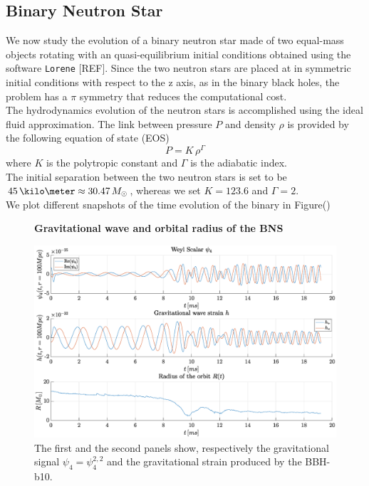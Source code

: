 \subsection{Binary Neutron Star}
We now study the evolution of a binary neutron star made of two equal-mass objects rotating with an quasi-equilibrium initial conditions obtained using the software \texttt{Lorene} [REF].
Since the two neutron stars are placed at in symmetric initial conditions with respect to the z axis, as in the binary black holes, the problem has a $\pi$ symmetry that reduces the computational cost.\\
The hydrodynamics evolution of the neutron stars is accomplished using the ideal fluid approximation. 
The link between pressure $P$ and density $\rho$ is provided by the following equation of state (EOS)
\begin{equation}
\label{eos}
P = K \, \rho ^{\Gamma}
\end{equation}
where $K$ is the polytropic constant and $\Gamma$ is the adiabatic index.\\
The initial separation between the two neutron stars is set to be $45 \, \kilo \meter \approx 30.47 \, M_{\odot}$, whereas we set $K=123.6$ and $\Gamma=2$.\\
We plot different snapshots of the time evolution of the binary in Figure()
      \begin{figure}[H]
\centering
    \textbf{Gravitational wave and orbital radius of the BNS}\par\medskip
\centering   
\includegraphics[width=1\textwidth]{numerical_evolution/gw_r_bns.eps}
\caption{The first and the second panels show, respectively the gravitational signal $\psi_4=\psi_4 ^{2,2}$ and the gravitational strain produced by the BBH-b10.}
\label{gw_r_bns}
\end{figure}





